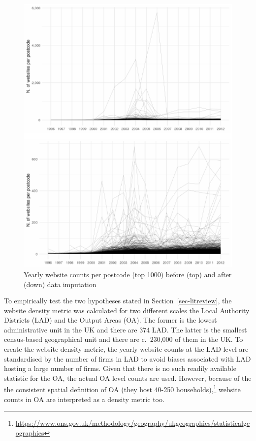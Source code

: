 \documentclass[
  authoryear,
  preprint,
  3p]{elsarticle}
\begin{document}
\begin{figure}[H]

{\centering \includegraphics[width=1\textwidth,height=0.7\textheight]{tranos2025_files/figure-pdf/unnamed-chunk-2-1.pdf}

}

\caption{\label{correct}Yearly website counts per postcode (top 1000)
before (top) and after (down) data imputation}

\end{figure}%

To empirically test the two hypotheses stated in
Section~\ref{sec-litreview}, the website density metric was calculated
for two different scales the Local Authority Districts (LAD) and the
Output Areas (OA). The former is the lowest administrative unit in the
UK and there are 374 LAD. The latter is the smallest census-based
geographical unit and there are c.~230,000 of them in the UK. To create
the website density metric, the yearly website counts at the LAD level
are standardised by the number of firms in LAD to avoid biases
associated with LAD hosting a large number of firms. Given that there is
no such readily available statistic for the OA, the actual OA level
counts are used. However, because of the the consistent spatial
definition of OA (they host 40-250 households),\footnote{\url{https://www.ons.gov.uk/methodology/geography/ukgeographies/statisticalgeographies}}
website counts in OA are interpreted as a density metric too.
\end{document}

